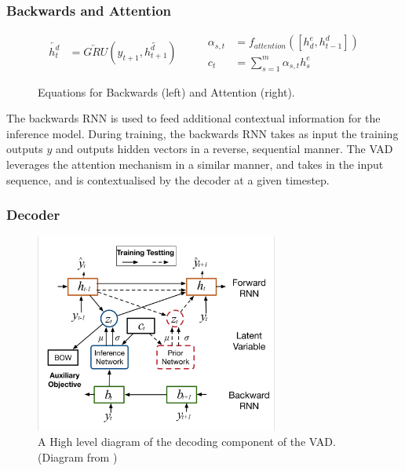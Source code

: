 \documentclass[12pt,twoside]{report}
\begin{document}
\subsubsection{Backwards and Attention}


\begin{figure}[!ht]
	\label{eqn:eqback}
	\begin{equation}
		\begin{split}
			\overleftarrow{h^d_t} &= \overleftarrow{GRU}(y_{t+1}, \overleftarrow{h^d_{t+1}})
		\end{split}
		\quad\quad
		\begin{split}
			\alpha_{s,t} &= f_{attention}([h^e_d, h^d_{t-1}]) \\
			c_t &= \sum^m_{s=1}\alpha_{s,t} h^e_s
		\end{split}
	\end{equation}
	\caption{Equations for Backwards (left) and Attention (right).}
	\end{figure}


The backwards RNN is used to feed additional contextual information for the inference model.  During training, the backwards RNN takes as input the training outputs $y$ and outputs hidden vectors in a reverse, sequential manner. The VAD leverages the attention mechanism in a similar manner, and takes in the input sequence, and is contextualised by the decoder at a given timestep.

\subsubsection{Decoder}
\begin{figure}[!ht]
	\centering
	\includegraphics[width=80mm]{diagrams/vad_decoder.png}
	\caption{A High level diagram of the decoding component of the VAD. (Diagram from \cite{du_variational_2018})\label{r:vad_decoder}}
	\end{figure}
	
\end{document}
